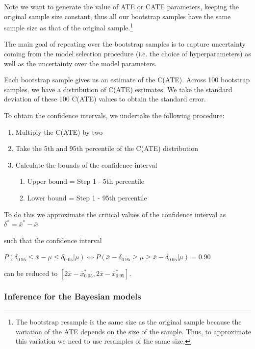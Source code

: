 \documentclass[12pt, a4paper]{article}
\begin{document}
Note we want to generate the value of ATE or CATE parameters, keeping the original sample size constant, thus all our bootstrap samples have the same sample size as that of the original sample.\footnote{The bootstrap resample is the same size as the original sample because the variation of the ATE depends on the size of the sample. Thus, to approximate this variation we need to use resamples of the same size.}

The main goal of repeating over the bootstrap samples is to capture uncertainty coming from the model selection procedure (i.e. the choice of hyperparameters) as well as the uncertainty over the model parameters.

Each bootstrap sample gives us an estimate of the C(ATE). Across 100 bootstrap samples, we have a distribution of C(ATE) estimates. We take the standard deviation of these 100 C(ATE) values to obtain the standard error. 

To obtain the confidence intervals, we undertake the following procedure:
\begin{enumerate}
\item Multiply the C(ATE) by two 
\item Take the 5th and 95th percentile of the C(ATE) distribution 
\item Calculate the bounds of the confidence interval 
	\begin{enumerate}
	\item Upper bound = Step 1 - 5th percentile 
	\item Lower bound = Step 1 - 95th percentile
	\end{enumerate}
\end{enumerate}

To do this we approximate the critical values of the confidence interval as $\delta^* = \bar{x}^* - \bar{x}$ 

such that the confidence interval 

$P(\delta_{0.95} \leq \bar{x} - \mu \leq \delta_{0.05} | \mu) \Leftrightarrow P(\bar{x} - \delta_{0.95} \geq \mu \geq \bar{x} - \delta_{0.05} | \mu) = 0.90$ 

can be reduced to $[2\bar{x} -\bar{x}^*_{0.05} , 2\bar{x} -\bar{x}^*_{0.95}]$.


\subsubsection*{Inference for the Bayesian models}
\end{document}
